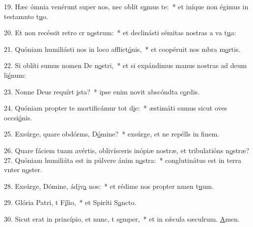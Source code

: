 19. Hæc ómnia venérunt super nos, nec oblít s\uline{u}mus te:~* et iníque non égimus in testamnto t\uline{u}o.\par 
20. Et non recéssit retro cr n\uline{o}strum:~* et declinásti sémitas nostras a va t\uline{u}a:\par 
21. Quóniam humiliásti nos in loco afflict\uline{ó}nis,~* et coopéruit nos mbra m\uline{o}rtis.\par 
22. Si oblíti sumus nomen De n\uline{o}stri,~* et si expándimus manus nostras ad deum li\uline{é}num:\par 
23. Nonne Deus requírt \uline{i}sta?~* ipse enim novit abscóndta c\uline{o}rdis.\par 
24. Quóniam propter te mortificámur tot d\uline{i}e:~* æstimáti sumus sicut oves occsi\uline{ó}nis.\par 
25. Exsúrge, quare obdórms, D\uline{ó}mine?~* exsúrge, et ne repélls in f\uline{i}nem.\par 
26. Quare fáciem tuam avértis, oblivísceris inópiæ nostræ, et tribulatións n\uline{o}stræ?
27. Quóniam humiliáta est in púlvere ánim n\uline{o}stra:~* conglutinátus est in terra vnter n\uline{o}ster.\par 
28. Exsúrge, Dómine, ádjv\uline{a} nos:~* et rédime nos propter nmen t\uline{u}um.\par 
29. Glória Patri, t F\uline{í}lio,~* et Spiríti S\uline{a}ncto.\par 
30. Sicut erat in princípio, et nunc, t s\uline{e}mper,~* et in sǽcula sæculrum. \uline{A}men.\par 
